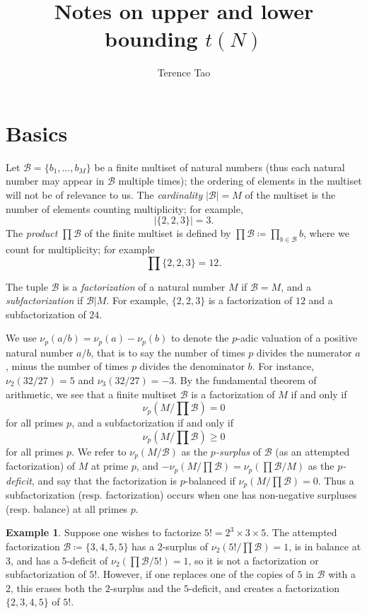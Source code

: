 \documentclass[12pt,a4paper,reqno]{amsart}
\numberwithin{equation}{section}
\theoremstyle{plain}
\theoremstyle{definition}
\newtheorem{example}[theorem]{Example}
\newcommand\tuple{{\mathcal B}}
\begin{document}
\title{Notes on upper and lower bounding $t(N)$}

\author{Terence Tao}
\maketitle


\section{Basics}

Let $\tuple = \{ b_1,\dots,b_M\}$ be a finite multiset of natural numbers (thus each natural number may appear in $\tuple$ multiple times); the ordering of elements in the multiset will not be of relevance to us.  The \emph{cardinality} $|\tuple| = M$ of the multiset is the number of elements counting multiplicity; for example,
$$ |\{ 2,2,3\}| = 3.$$
The \emph{product} $\prod \tuple$ of the finite multiset is defined by $\prod \tuple \coloneqq \prod_{b \in \tuple} b$, where we count for multiplicity; for example
$$ \prod \{2,2,3\} = 12.$$

The tuple $\tuple$ is a \emph{factorization} of a natural number $M$ if $\tuple = M$, and a \emph{subfactorization} if $\tuple | M$.  For example, $\{2,2,3\}$ is a factorization of $12$ and a subfactorization of $24$.

We use $\nu_p(a/b) = \nu_p(a)-\nu_p(b)$ to denote the $p$-adic valuation of a positive natural number $a/b$, that is to say the number of times $p$ divides the numerator $a$, minus the number of times $p$ divides the denominator $b$.  For instance, $\nu_2(32/27)=5$ and $\nu_3(32/27)=-3$.  By the fundamental theorem of arithmetic, we see that a finite multiset $\tuple$ is a factorization of $M$ if and only if
$$ \nu_p( M / \prod \tuple ) = 0$$
for all primes $p$, and a subfactorization if and only if
$$ \nu_p( M / \prod \tuple ) \geq 0$$
for all primes $p$.  We refer to $\nu_p( M / \tuple )$ as the \emph{$p$-surplus} of $\tuple$ (as an attempted factorization) of $M$ at prime $p$, and $-\nu_p(M/\prod\tuple) = \nu_p(\prod\tuple/M)$ as the \emph{$p$-deficit}, and say that the factorization is $p$-balanced if $\nu_p(M/\prod \tuple)=0$.  Thus a subfactorization (resp. factorization) occurs when one has non-negative surpluses (resp. balance) at all primes $p$.

\begin{example} Suppose one wishes to factorize $5! = 2^3 \times 3 \times 5$.  The attempted factorization ${\mathcal B} \coloneqq \{3,4,5,5\}$ has a $2$-surplus of $\nu_2(5!/\prod {\mathcal B}) = 1$, is in balance at $3$, and has a $5$-deficit of $\nu_2(\prod {\mathcal B}/5!) = 1$, so it is not a factorization or subfactorization of $5!$.  However, if one replaces one of the copies of $5$ in ${\mathcal B}$ with a $2$, this erases both the $2$-surplus and the $5$-deficit, and creates a factorization $\{2,3,4,5\}$ of $5!$.
\end{example}
\end{document}

